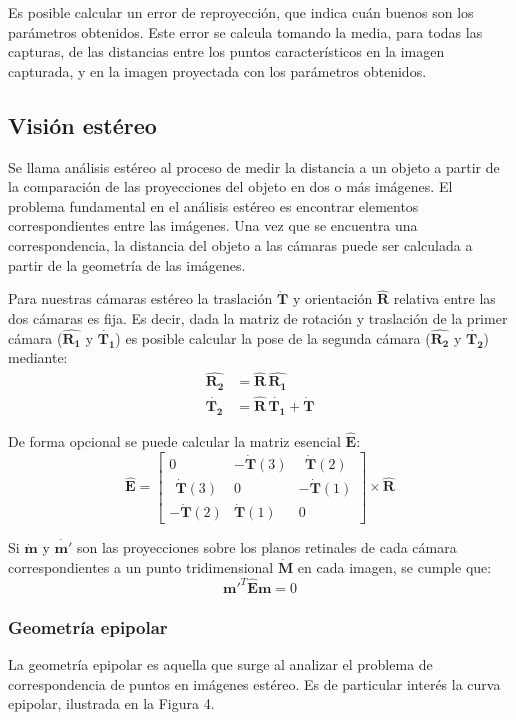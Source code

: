 \documentclass[11pt,a4paper,titlepage]{article}
\newcommand{\Two}[1]{\ensuremath{\mathbf{#1}}}
\newcommand{\Mat}[1]{\ensuremath{\mathbf{\hat{#1}}}}
\newcommand{\TwoCart}[1]{\ensuremath{\mathbf{\dot{#1}}}}
\newcommand{\ThreeCart}[1]{\ensuremath{\mathbf{\dot{#1}}}}
\newcommand{\Figure}[1]{Figura #1}
\begin{document}
Es posible calcular un error de reproyección, que indica cuán buenos son los parámetros obtenidos. Este error se calcula tomando la media, para todas las capturas, de las distancias entre los puntos característicos en la imagen capturada, y en la imagen proyectada con los parámetros obtenidos.

\subsection{Visión estéreo}

Se llama análisis estéreo al proceso de medir la distancia a un objeto a partir de la comparación de las proyecciones del objeto en dos o más imágenes. El problema fundamental en el análisis estéreo es encontrar elementos correspondientes entre las imágenes. Una vez que se encuentra una correspondencia, la distancia del objeto a las cámaras puede ser calculada a partir de la geometría de las imágenes.

Para nuestras cámaras estéreo la traslación \ThreeCart{T} y orientación \Mat{R} relativa entre las dos cámaras es fija. Es decir, dada la matriz de rotación y traslación de la primer cámara (\Mat{R_1} y \ThreeCart{T_1}) es posible calcular la pose de la segunda cámara (\Mat{R_2} y \ThreeCart{T_2}) mediante:
\begin{align*}
	\Mat{R_2} &= \Mat{R} \, \Mat{R_1} \\
	\ThreeCart{T_2} &= \Mat{R} \, \ThreeCart{T_1} + \ThreeCart{T}
\end{align*}

De forma opcional se puede calcular la matriz esencial \Mat{E}:
\[
	\Mat{E} =
	\begin{bmatrix}
		0 & -\ThreeCart{T}(3) & \ \ \ThreeCart{T}(2) \\
		\ \ \ThreeCart{T}(3) & 0 & -\ThreeCart{T}(1) \\
		-\ThreeCart{T}(2) & \ThreeCart{T}(1) & 0
	\end{bmatrix}
	\times \Mat{R}
\]

Si \TwoCart{m} y  \TwoCart{m'} son las proyecciones sobre los planos retinales de cada cámara correspondientes a un punto tridimensional \ThreeCart{M} en cada imagen, se cumple que:
\[
	\Two{m'}^T \Mat{E} \Two{m} = 0
\]

\subsubsection{Geometría epipolar}

La geometría epipolar es aquella que surge al analizar el problema de correspondencia de puntos en imágenes estéreo. Es de particular interés la curva epipolar, ilustrada en la \Figure{4}.
\end{document}
